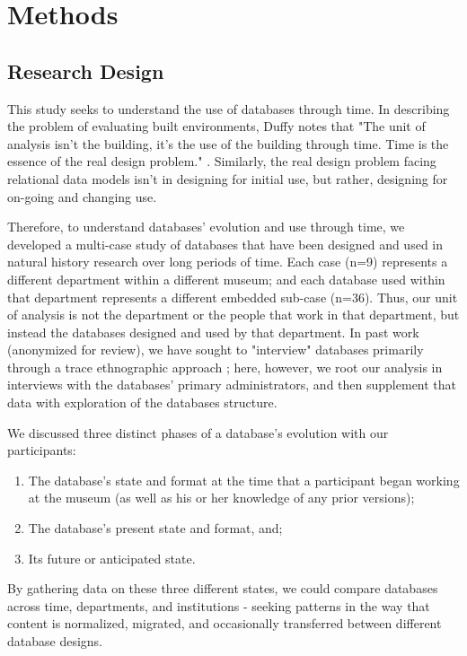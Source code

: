 \section{Methods}

\subsection{Research Design}

This study seeks to understand the use of databases through time. In describing the problem of evaluating built environments, Duffy notes that "The unit of analysis isn't the building, it's the use of the building through time. Time is the essence of the real design problem." \cite{duffy1990measuring}. Similarly, the real design problem facing relational data models isn't in designing for initial use, but rather, designing for on-going and changing use. 

Therefore, to understand databases' evolution and use through time, we developed a multi-case study of databases that have been designed and used in natural history research over long periods of time. Each case (n=9) represents a different department within a different museum; and each database used within that department represents a different embedded sub-case (n=36). Thus, our unit of analysis is not the department or the people that work in that department, but instead the databases designed and used by that department. In past work (anonymized for review), we have sought to "interview" databases primarily through a trace ethnographic approach \cite{Geiger_2011}; here, however, we root our analysis in interviews with the databases' primary administrators, and then supplement that data with exploration of the databases structure. 

We discussed three distinct phases of a database's evolution with our participants: 
\begin{enumerate}
\item The database's state and format at the time that a participant began working at the museum (as well as his or her knowledge of any prior versions); 
\item The database's present state and format, and; 
\item Its future or anticipated state. 
\end{enumerate}
By gathering data on these three different states, we could  compare databases across time, departments, and institutions - seeking patterns in the way that content is normalized, migrated, and occasionally transferred between different database designs. 

